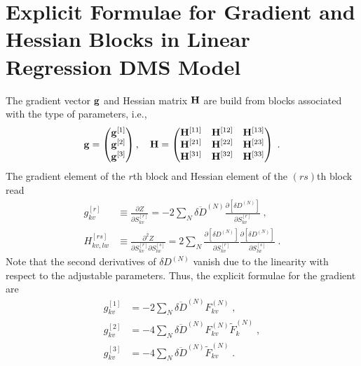 \documentclass[aip,amsmath,amssymb,reprint,floatfix]{revtex4-1}
\begin{document}
\section{\label{a:blocks} Explicit Formulae for Gradient and Hessian Blocks in Linear Regression DMS Model}

The gradient vector ${\bf g}$ and Hessian matrix ${\bf H}$ 
are build from blocks associated with the type of parameters, i.e.,
%
\begin{equation}\label{e:Newton.gH}
 {\bf g} = 
\begin{pmatrix}
{\bf g}^{[1]} \\ 
{\bf g}^{[2]} \\ 
{\bf g}^{[3]}
\end{pmatrix} ,\quad
 {\bf H} = 
\begin{pmatrix}
{\bf H}^{[11]} & {\bf H}^{[12]} & {\bf H}^{[13]} \\ 
{\bf H}^{[21]} & {\bf H}^{[22]} & {\bf H}^{[23]} \\ 
{\bf H}^{[31]} & {\bf H}^{[32]} & {\bf H}^{[33]} 
\end{pmatrix} \;.
\end{equation}
%
The gradient element of the $r$th block and Hessian element of the $(rs)$th block read
%
\begin{subequations}
 \begin{align}
  g^{[r ]}_{kv}    &\equiv \frac{\partial   Z}{\partial S_{kv}^{[r]}} 
     =-2\sum_N \overline{\delta D}^{(N)}
               \frac{\partial   \left[ \delta D^{(N)} \right]}{\partial S_{kv}^{[r]}} \;,\\
  H^{[rs]}_{kv,lw} &\equiv \frac{\partial^2 Z}{\partial S_{kv}^{[r]} \partial S_{lw}^{[s]}}  
     = 2\sum_N 
        \frac{\partial   \left[ \delta D^{(N)} \right]}{\partial S_{kv}^{[r]}}
        \frac{\partial   \left[ \delta D^{(N)} \right]}{\partial S_{lw}^{[s]}} \;.
 \end{align}
\end{subequations}
%
Note that the second derivatives of $\delta D^{(N)}$ vanish
due to the linearity with respect to the adjustable parameters.
Thus, the explicit formulae for the gradient are
%
\begin{subequations}
 \begin{align}
  g^{[1]}_{kv} &=-2\sum_N \overline{\delta D}^{(N)} F^{(N)}_{kv} \;,\\
  g^{[2]}_{kv} &=-4\sum_N \overline{\delta D}^{(N)} F^{(N)}_{kv} \widetilde{F}^{(N)}_k \;,\\
  g^{[3]}_{kv} &=-4\sum_N \overline{\delta D}^{(N)} \widetilde{F}^{(N)}_{kv} \;.
 \end{align}
\end{subequations}
\end{document}
